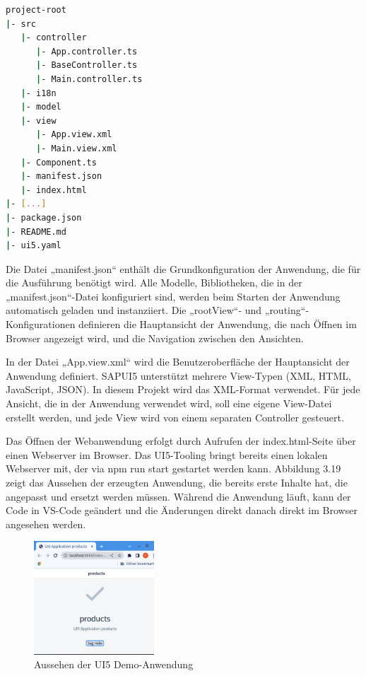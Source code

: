 \begin{lstlisting}[language=bash,  caption=Die grundlegende Projektstruktur eines SAPUI5-Projekts]
project-root
|- src
   |- controller
      |- App.controller.ts
      |- BaseController.ts
      |- Main.controller.ts
   |- i18n
   |- model
   |- view
      |- App.view.xml
      |- Main.view.xml
   |- Component.ts
   |- manifest.json
   |- index.html
|- [...]
|- package.json
|- README.md
|- ui5.yaml
\end{lstlisting}

Die Datei „manifest.json“ enthält die Grundkonfiguration der Anwendung, die für die Ausführung benötigt wird. Alle Modelle, Bibliotheken, die in der „manifest.json“-Datei konfiguriert sind, werden beim Starten der Anwendung automatisch geladen und instanziiert. Die „rootView“- und „routing“-Konfigurationen definieren die Hauptansicht der Anwendung, die nach Öffnen im Browser angezeigt wird, und die Navigation zwischen den Ansichten.

In der Datei „App.view.xml“ wird die Benutzeroberfläche der Hauptansicht der Anwendung definiert. SAPUI5 unterstützt mehrere View-Typen (XML, HTML, JavaScript, JSON). In diesem Projekt wird das XML-Format verwendet. Für jede Ansicht, die in der Anwendung verwendet wird, soll eine eigene View-Datei erstellt werden, und jede View wird von einem separaten Controller gesteuert. 

Das Öffnen der Webanwendung erfolgt durch Aufrufen der index.html-Seite   über einen Webserver im Browser.  Das UI5-Tooling bringt bereits einen lokalen Webserver mit, der via npm run start gestartet werden kann.  Abbildung 3.19 zeigt das Aussehen der erzeugten Anwendung, die bereits erste Inhalte hat, die angepasst und ersetzt werden müssen. Während die Anwendung läuft, kann der Code in VS-Code geändert und die Änderungen direkt danach direkt im Browser angesehen werden. 

\begin{figure}[htbp]
 \centering
 \includegraphics[width=0.4\textwidth]{Bilder/ui5 freestyle/3_19_ui5_demo.png}
 \caption{Aussehen der UI5 Demo-Anwendung}
\end{figure}

